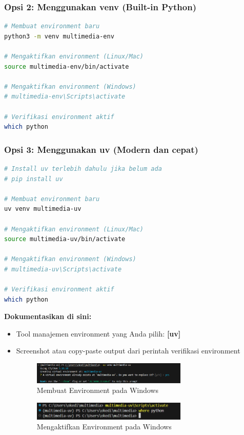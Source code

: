 \documentclass[11pt,a4paper]{article}
\begin{document}
\subsubsection{Opsi 2: Menggunakan venv (Built-in Python)}
\begin{lstlisting}[language=bash, caption=Membuat environment dengan venv]
# Membuat environment baru
python3 -m venv multimedia-env

# Mengaktifkan environment (Linux/Mac)
source multimedia-env/bin/activate

# Mengaktifkan environment (Windows)
# multimedia-env\Scripts\activate

# Verifikasi environment aktif
which python
\end{lstlisting}

\subsubsection{Opsi 3: Menggunakan uv (Modern dan cepat)}
\begin{lstlisting}[language=bash, caption=Membuat environment dengan uv]
# Install uv terlebih dahulu jika belum ada
# pip install uv

# Membuat environment baru
uv venv multimedia-uv

# Mengaktifkan environment (Linux/Mac)
source multimedia-uv/bin/activate

# Mengaktifkan environment (Windows)
# multimedia-uv\Scripts\activate

# Verifikasi environment aktif
which python
\end{lstlisting}

\textbf{Dokumentasikan di sini:}
\begin{itemize}
    \item Tool manajemen environment yang Anda pilih: \textbf{[uv]}
    \item Screenshot atau copy-paste output dari perintah verifikasi environment
    \begin{figure}[htbp] 
    \centering
    \includegraphics[width=0.7\textwidth]{Figure/ss1.png}
    \caption{Membuat Environment pada Windows}
    \label{fig:contoh-gambar}
    \end{figure}

    \begin{figure}[htbp] 
    \centering
    \includegraphics[width=0.7\textwidth]{Figure/ss2.png}
    \caption{Mengaktifkan Environment pada Windows}
    \label{fig:contoh-gambar}
    \end{figure}
\end{itemize}
\end{document}
